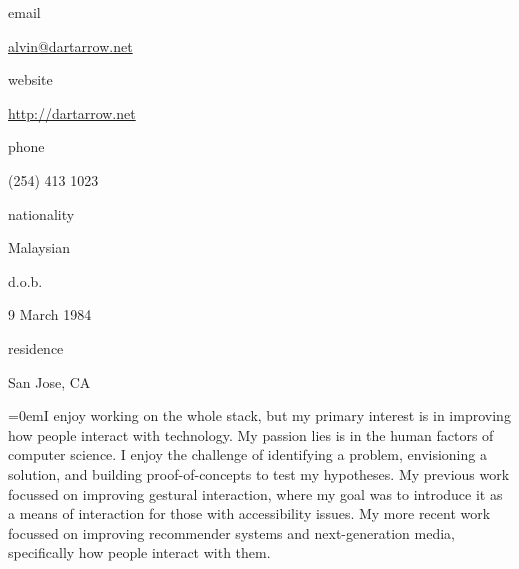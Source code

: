 \documentclass[a4paper]{scrartcl}
\newcommand{\Columize}[2]{\noindent \parbox{2cm}{{#1}} {#2} } %
\newcommand{\Description}[1]{\hangindent=0em\hangafter=0\noindent\footnotesize{#1}\par\normalsize\vspace{1em}} %
\newcommand{\Redvline}[0]{\vspace{0.5em}\noindent{\color{ThemeColor}\rule{16cm}{0.4pt}}}
\newcommand{\MyName}[1]{\noindent{\textsc{\LARGE{\color{ThemeColor}#1}}}} %
\newcommand{\BlockTitle}[1]{\textsc{\vspace{0.15em}}\noindent{\spacedlowsmallcaps{#1}}\vspace{1em}}
\begin{document}
\thispagestyle{empty} %


\MyName{Alvin Jude} %

\vspace{-0.3em}

\Redvline

\begin{multicols}{2}
\Columize{email}{\href{mailto:alvin@dartarrow.net}{alvin@dartarrow.net}} %

\Columize{website}{\href{http://dartarrow.net}{http://dartarrow.net}} %

\Columize{phone}{(254) 413 1023 } %

\columnbreak

\Columize{nationality}{Malaysian}

\Columize{d.o.b.}{9 March 1984} 

\Columize{residence}{San Jose, CA} 




\end{multicols}

\vspace{1em} %


\Description{I enjoy working on the whole stack, but my primary interest is in improving how people interact with technology. My passion lies is in the human factors of computer science. I enjoy the challenge of identifying a problem, envisioning a solution, and building proof-of-concepts to test my hypotheses. My previous work focussed on improving gestural interaction, where my goal was to introduce it as a means of interaction for those with accessibility issues. My more recent work focussed on improving recommender systems and next-generation media, specifically how people interact with them. } 

\Redvline
\end{document}
